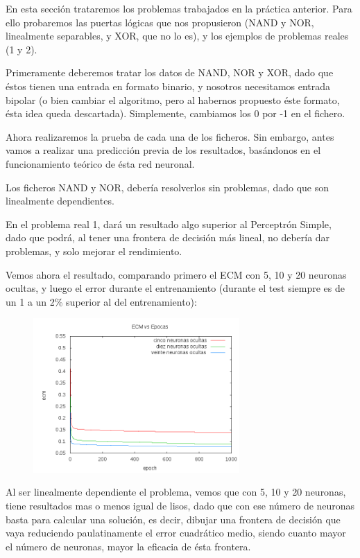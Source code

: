\documentclass[12pt]{article}
\begin{document}
En esta sección trataremos los problemas trabajados en la práctica anterior. Para ello probaremos las puertas lógicas que nos propusieron (NAND y NOR, linealmente separables, y XOR, que no lo es), y los ejemplos de problemas reales (1 y 2).

Primeramente deberemos tratar los datos de NAND, NOR y XOR, dado que éstos tienen una entrada en formato binario, y nosotros necesitamos entrada bipolar (o bien cambiar el algoritmo, pero al habernos propuesto éste formato, ésta idea queda descartada). Simplemente, cambiamos los 0 por -1 en el fichero.

Ahora realizaremos la prueba de cada una de los ficheros. Sin embargo, antes vamos a realizar una predicción previa de los resultados, basándonos en el funcionamiento teórico de ésta red neuronal.

Los ficheros NAND y NOR, debería resolverlos sin problemas, dado que son linealmente dependientes. 

En el problema real 1, dará un resultado algo superior al Perceptrón Simple, dado que podrá, al tener una frontera de decisión más lineal, no debería dar problemas, y solo mejorar el rendimiento.

Vemos ahora el resultado, comparando primero el ECM con 5, 10 y 20 neuronas ocultas, y luego el error durante el entrenamiento (durante el test siempre es de un 1 a un 2\% superior al del entrenamiento):

\begin{figure}[h!]
    \label{fig:ecm_pr1}
  \centering
       \includegraphics[width=0.7\textwidth]{recursos/ecm_pr1}
\end{figure} 

Al ser linealmente dependiente el problema, vemos que con 5, 10 y 20 neuronas, tiene resultados mas o menos igual de lisos, dado que con ese número de neuronas basta para calcular una solución, es decir, dibujar una frontera de decisión que vaya reduciendo paulatinamente el error cuadrático medio, siendo cuanto mayor el número de neuronas, mayor la eficacia de ésta frontera.
\end{document}
